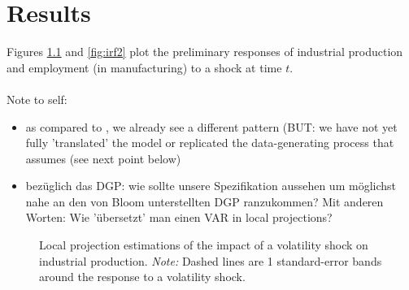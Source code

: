 \documentclass[a4paper,12pt,oneside,pointednumbers,numbers=noenddot,bibtotoc,bigheadings,liststotoc,chapterprefix=true]{scrbook}
\begin{document}
\chapter{Results}
Figures \ref{fig:irf1} and \ref{fig:irf2} plot the preliminary responses of industrial production and employment (in manufacturing) to a shock at time $t$. \\
\\
Note to self:
\begin{itemize}
	\item as compared to \citet{bloom:09}, we already see a different pattern (BUT: we have not yet fully 'translated' the model or replicated the data-generating process that \citet{bloom:09} assumes (see next point below)
	\item bezüglich das DGP: wie sollte unsere Spezifikation aussehen um möglichst nahe an den von Bloom unterstellten DGP ranzukommen? Mit anderen Worten: Wie 'übersetzt' man einen VAR in local projections?
\end{itemize}

\begin{figure}[hbt]
   \centering
   \setlength\fboxsep{0pt}
   \setlength\fboxrule{0pt}
      \caption[Local projection estimations of the impact of a volatility shock on industrial production.]{Local projection estimations of the impact of a volatility shock on industrial production.
      \textit{Note:} Dashed lines are 1 standard-error bands around the response to a volatility shock.}
   \label{fig:irf1}
\end{figure}
\end{document}
